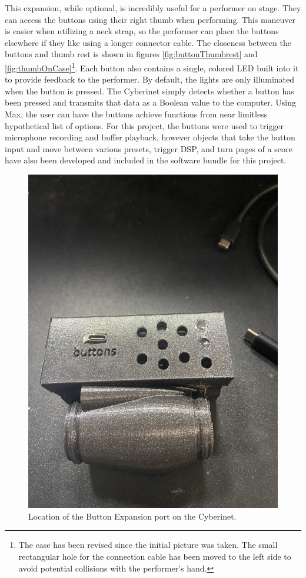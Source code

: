 This expansion, while optional, is incredibly useful for a performer on stage. They can access the buttons using their right thumb when performing. This maneuver is easier when utilizing a neck strap, so the performer can place the buttons elsewhere if they like using a longer connector cable. The closeness between the buttons and thumb rest is shown in figures \ref{fig:buttonThumbrest} and \ref{fig:thumbOnCase}\footnote{The case has been revised since the initial picture was taken. The small rectangular hole for the connection cable has been moved to the left side to avoid potential collisions with the performer's hand.}. Each button also contains a single, colored LED built into it to provide feedback to the performer. By default, the lights are only illuminated when the button is pressed. The Cyberinet simply detects whether a button has been pressed and transmits that data as a Boolean value to the computer. Using Max, the user can have the buttons achieve functions from near limitless hypothetical list of options. For this project, the buttons were used to trigger microphone recording and buffer playback, however objects that take the button input and move between various presets, trigger DSP, and turn pages of a score have also been developed and included in the software bundle for this project.

\begin{figure} %
    \centering 
    \includegraphics[scale=0.05, angle=270]{diagrams/builtUnits/buttonPort.JPG}
    \caption{Location of the Button Expansion port on the Cyberinet.}
    \label{fig:buttonPort}
\end{figure}

